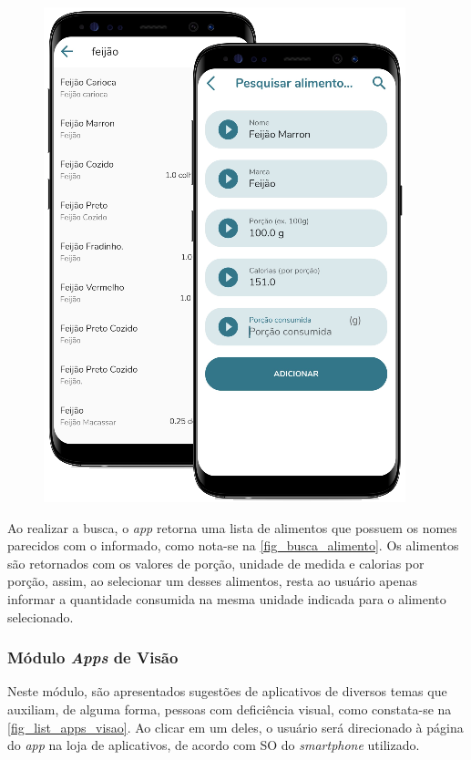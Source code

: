 \begin{figure}[htb]
\begin{minipage}{0.58\textwidth}
        \includegraphics[scale=0.66]{Imagens/desenvolvimento/app/busca_alimento.png}
    \end{minipage}
\end{figure}

Ao realizar a busca, o \emph{app} retorna uma lista de alimentos que possuem os nomes parecidos com o
informado, como nota-se na \autoref{fig_busca_alimento}. Os alimentos são retornados com os valores de
porção, unidade de medida e calorias por porção, assim, ao selecionar um desses alimentos, resta ao usuário
apenas informar a quantidade consumida na mesma unidade indicada para o alimento selecionado.

\newpage

\subsubsection{Módulo \emph{Apps} de Visão}

Neste módulo, são apresentados sugestões de aplicativos de diversos temas que auxiliam, de alguma forma, pessoas
com deficiência visual, como constata-se na \autoref{fig_list_apps_visao}. Ao clicar em um deles, o usuário será
direcionado à página do \emph{app} na loja de aplicativos, de acordo com SO do \emph{smartphone} utilizado.

